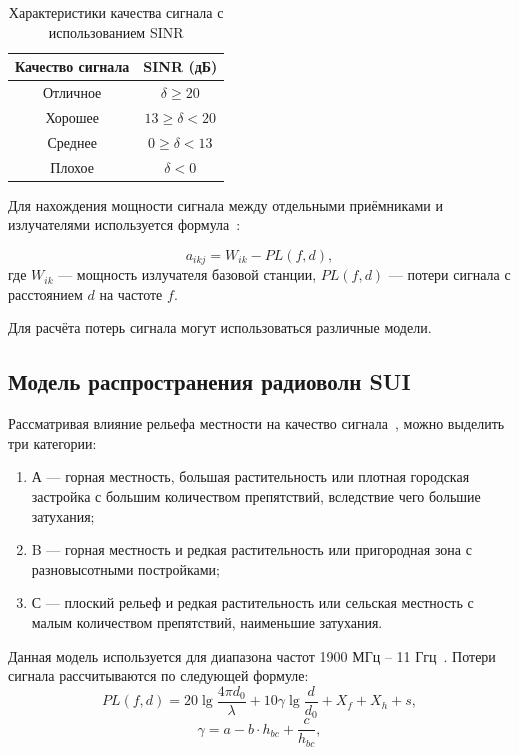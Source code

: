 \captionsetup{justification=raggedright, singlelinecheck=false}
\begin{table}[H]
	\centering
	\begin{threeparttable}
		\caption{\label{tbl:sig-quality}Характеристики качества сигнала с использованием SINR}
		\begin{tabular}{|c|c|}
			\hline
			Качество сигнала & SINR (дБ)\\\hline
			Отличное& $\delta \ge 20$\\\hline
			Хорошее& $13 \ge \delta < 20$ \\\hline
			Среднее& $0 \ge \delta < 13$ \\\hline
			Плохое& $\delta < 0$\\\hline
		\end{tabular}	
	\end{threeparttable}
\end{table}



Для нахождения мощности сигнала между отдельными приёмниками и 
излучателями  используется формула~\cite{atb}:

\begin{equation}
	a_{ikj} = W_{ik} - PL(f, d),
\end{equation}
где $W_{ik}$ --- мощность излучателя базовой станции, $PL(f, d)$ --- потери 
сигнала с расстоянием $d$ на частоте $f$. 

Для расчёта потерь сигнала могут использоваться различные модели.

\subsection{Модель распространения радиоволн SUI}

Рассматривая влияние рельефа местности на качество сигнала~\cite{pl}, можно выделить три категории:
\begin{enumerate}
	\item А --- горная местность, большая растительность или плотная городская застройка с большим количеством препятствий, вследствие чего большие затухания;
	\item B --- горная местность и редкая растительность или пригородная зона с разновысотными постройками; 
	\item С --- плоский рельеф и редкая растительность или сельская местность с малым количеством препятствий, наименьшие затухания.
\end{enumerate}
Данная модель используется для диапазона частот 1900 МГц -- 11 Ггц~\cite{sui}.
Потери сигнала рассчитываются по следующей формуле:
\begin{equation}
	PL(f, d) = 20\lg\frac{4\pi d_0}{\lambda} + 10\gamma\lg\frac{d}{d_0} + X_f + X_h + s, 
\end{equation}
\vspace{-5mm}
\begin{equation}
	\gamma = a - b \cdot h_{bc} + \frac{c}{h_{bc}},
\end{equation}

